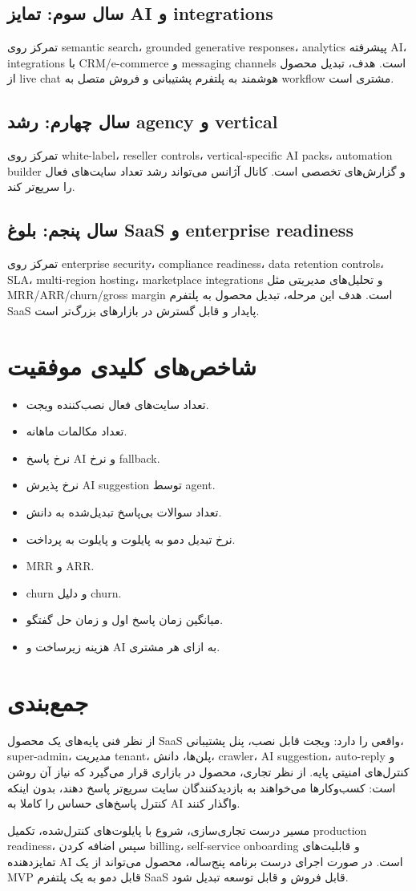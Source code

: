 \documentclass[12pt,a4paper]{article}
\newcommand{\en}[1]{\lr{#1}}
\begin{document}
\subsection{سال سوم: تمایز AI و integrations}
تمرکز روی semantic search، grounded generative responses، analytics پیشرفته AI، integrations با CRM/e-commerce و messaging channels است. هدف، تبدیل محصول از live chat هوشمند به پلتفرم پشتیبانی و فروش متصل به workflow مشتری است.

\subsection{سال چهارم: رشد agency و vertical}
تمرکز روی white-label، reseller controls، vertical-specific AI packs، automation builder و گزارش‌های تخصصی است. کانال آژانس می‌تواند رشد تعداد سایت‌های فعال را سریع‌تر کند.

\subsection{سال پنجم: بلوغ SaaS و enterprise readiness}
تمرکز روی enterprise security، compliance readiness، data retention controls، SLA، multi-region hosting، marketplace integrations و تحلیل‌های مدیریتی مثل MRR/ARR/churn/gross margin است. هدف این مرحله، تبدیل محصول به پلتفرم SaaS پایدار و قابل گسترش در بازارهای بزرگ‌تر است.

\section{شاخص‌های کلیدی موفقیت}
\begin{itemize}
  \item تعداد سایت‌های فعال نصب‌کننده ویجت.
  \item تعداد مکالمات ماهانه.
  \item نرخ پاسخ AI و نرخ fallback.
  \item نرخ پذیرش AI suggestion توسط agent.
  \item تعداد سوالات بی‌پاسخ تبدیل‌شده به دانش.
  \item نرخ تبدیل دمو به پایلوت و پایلوت به پرداخت.
  \item MRR و ARR.
  \item churn و دلیل churn.
  \item میانگین زمان پاسخ اول و زمان حل گفتگو.
  \item هزینه زیرساخت و AI به ازای هر مشتری.
\end{itemize}

\section{جمع‌بندی}
\en{AI Chat SaaS} از نظر فنی پایه‌های یک محصول SaaS واقعی را دارد: ویجت قابل نصب، پنل پشتیبانی، super-admin، مدیریت tenant، پلن‌ها، دانش، crawler، AI suggestion، auto-reply و کنترل‌های امنیتی پایه. از نظر تجاری، محصول در بازاری قرار می‌گیرد که نیاز آن روشن است: کسب‌وکارها می‌خواهند به بازدیدکنندگان سایت سریع‌تر پاسخ دهند، بدون اینکه کنترل پاسخ‌های حساس را کاملا به AI واگذار کنند.

مسیر درست تجاری‌سازی، شروع با پایلوت‌های کنترل‌شده، تکمیل production readiness، سپس اضافه کردن billing، self-service onboarding و قابلیت‌های تمایزدهنده AI است. در صورت اجرای درست برنامه پنج‌ساله، محصول می‌تواند از یک MVP قابل دمو به یک پلتفرم SaaS قابل فروش و قابل توسعه تبدیل شود.
\end{document}
